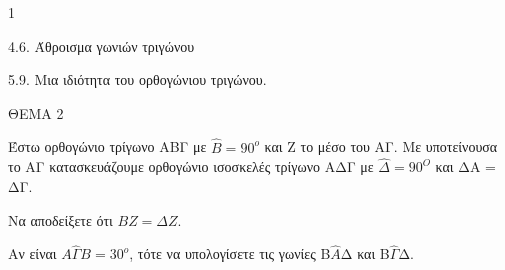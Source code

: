 \begin{ylh}{1}
    \item 4.6. Άθροισμα γωνιών τριγώνου
    \item 5.9. Μια ιδιότητα του ορθογώνιου τριγώνου.
\end{ylh}

ΘΕΜΑ 2

Έστω ορθογώνιο τρίγωνο ΑΒΓ με $\widehat{Β} = 90^{ο}$ και Ζ το μέσο του ΑΓ. Με υποτείνουσα το ΑΓ κατασκευάζουμε ορθογώνιο ισοσκελές τρίγωνο ΑΔΓ με $\widehat{\Delta} = 90^{Ο}$ και ΔΑ = ΔΓ.

\begin{alist}
\item Να αποδείξετε ότι $ΒΖ = \Delta Ζ$. 

\item Αν είναι $Α\widehat{\Gamma}Β = 30^{ο}$, τότε να υπολογίσετε τις γωνίες Β$\widehat{Α}$Δ και Β$\widehat{\Gamma}$Δ. 


\begin{center}
\end{center}
\end{alist}
